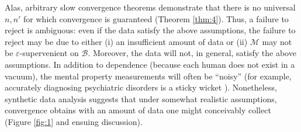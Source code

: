 \documentclass{article}
\newcommand{\eps}{\varepsilon}
\providecommand{\mc}[1]{\mathcal{#1}}
\begin{document}
Alas, arbitrary slow convergence theorems demonstrate that there is no universal $n,n'$ for which convergence is guaranteed (Theorem \ref{thm:4}).  Thus, a failure to reject is ambiguous: even if the data satisfy the above assumptions, the failure to reject may be due to either (i) an insufficient amount of data or (ii) $\mc{M}$ may not be $\eps$-supervenient on $\mc{B}$.  Moreover, the data will not, in general, satisfy the above assumptions.  In addition to dependence (because each human does not exist in a vacuum), the mental property measurements will often be ``noisy'' (for example, accurately diagnosing psychiatric disorders is a sticky wicket \cite{Kessler2005}). 
% 
Nonetheless, synthetic data analysis suggests that under somewhat realistic assumptions, convergence obtains with an amount of data one might conceivably collect (Figure \ref{fig:1} and ensuing discussion).  


 


\end{document}
